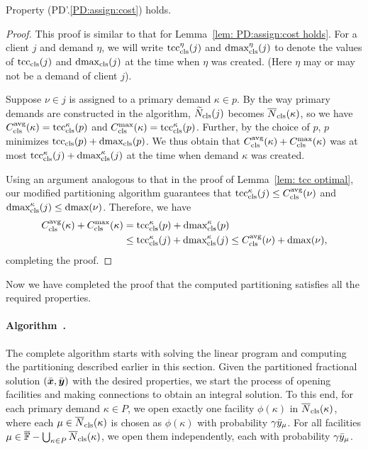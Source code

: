 
\begin{lemma}\label{lem: PD1: primary optimal}
  Property (PD'.\ref{PD:assign:cost}) holds.
\end{lemma}

\begin{proof}
This proof is similar to that for Lemma~\ref{lem: PD:assign:cost holds}.
For a client $j$ and demand $\eta$, we will write
$\mbox{\rm{tcc}}_{\text{cls}}^\eta(j)$ and $\mbox{\rm{dmax}}_{\text{cls}}^\eta(j)$ to denote the values of
$\mbox{\rm{tcc}}_{\text{cls}}(j)$ and $\mbox{\rm{dmax}}_{\text{cls}}(j)$ at the time when $\eta$
was created. (Here $\eta$ may or may not be a demand of client $j$).

Suppose $\nu \in j$ is assigned to a primary demand $\kappa \in p$.
By the way primary demands are constructed in the algorithm, 
${\widetilde N}_{\text{cls}}(j)$ becomes ${\overline{N}}_{\text{cls}}(\kappa)$, so we have
$C_{\text{cls}}^{{\mbox{\scriptsize\rm avg}}}(\kappa) = \mbox{\rm{tcc}}_{\text{cls}}^\kappa (p)$ and 
$C_{\text{cls}}^{\max}(\kappa) = \mbox{\rm{tcc}}_{\text{cls}}^\kappa(p)$. Further,  
by the choice of $p$, $p$ minimizes $\mbox{\rm{tcc}}_{\text{cls}}(p) + \mbox{\rm{dmax}}_{\text{cls}}(p)$.
We thus obtain that $C_{\text{cls}}^{{\mbox{\scriptsize\rm avg}}}(\kappa) + C_{\text{cls}}^{\max}(\kappa)$ was at most
$\mbox{\rm{tcc}}_{\text{cls}}^\kappa(j) + \mbox{\rm{dmax}}_{\text{cls}}^\kappa(j)$ at the time when demand
$\kappa$ was created.

Using an argument analogous to that in the proof of Lemma~\ref{lem: tcc optimal}, 
our modified partitioning algorithm guarantees that
  $\mbox{\rm{tcc}}_{\text{cls}}^{\kappa}(j) \leq C_{\text{cls}}^{{\mbox{\scriptsize\rm avg}}}(\nu)$ and
  $\mbox{\rm{dmax}}_{\text{cls}}^{\kappa}(j) \leq \text{dmax}(\nu)$.
  Therefore, we have
%
  \begin{align*}
    C_{\text{cls}}^{{\mbox{\scriptsize\rm avg}}}(\kappa) + C_{\text{cls}}^{\max}(\kappa) &= \mbox{\rm{tcc}}_{\text{cls}}^{\kappa}(p) +	\mbox{\rm{dmax}}_{\text{cls}}^{\kappa}(p) 
					\\
					&\leq \mbox{\rm{tcc}}_{\text{cls}}^{\kappa}(j) + \mbox{\rm{dmax}}_{\text{cls}}^{\kappa}(j) 
					\leq C_{\text{cls}}^{{\mbox{\scriptsize\rm avg}}}(\nu) + \text{dmax}(\nu),
  \end{align*}
%
completing the proof.
\end{proof}


Now we have completed the proof that the computed partitioning satisfies
all the required properties. 


\paragraph{Algorithm~{\EBGS}.}
The complete algorithm starts with solving the linear program and
computing the partitioning described earlier in this section.
Given the partitioned fractional solution $(\bar{\boldsymbol{x}},
\bar{\boldsymbol{y}})$ with the desired properties, we start the process of opening
facilities and making connections to obtain an integral
solution. To this end, for each primary demand $\kappa\in P$,
we open exactly one facility $\phi(\kappa)$ in ${\overline{N}}_{\text{cls}}(\kappa)$,
where each $\mu\in{\overline{N}}_{\text{cls}}(\kappa)$ is chosen as $\phi(\kappa)$ with probability
$\gamma{\bar y}_{\mu}$. For all facilities
 $\mu\in\overline{\mathbb{F}} - \bigcup_{\kappa\in P}{\overline{N}}_{\text{cls}}(\kappa)$,
we open them independently, each with
probability $\gamma{\bar y}_{\mu}$. 

